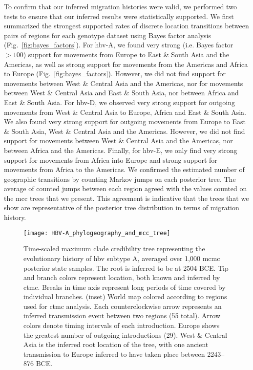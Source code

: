 To confirm that our inferred migration histories were valid, we performed two tests to ensure that our inferred results were statistically supported.
We first summarized the strongest supported rates of discrete location transitions between pairs of regions for each genotype dataset using Bayes factor analysis (Fig.~\ref{fig:bayes_factors}).
For \gls{hbv}-A, we found very strong (i.e. Bayes factor $>100$) support for movements from Europe to East \& South Asia and the Americas, as well as strong support for movements from the Americas and Africa to Europe (Fig.~\ref{fig:bayes_factors}).
However, we did not find support for movements between West \& Central Asia and the Americas, nor for movements between West \& Central Asia and East \& South Asia, nor between Africa and East \& South Asia.
For \gls{hbv}-D, we observed very strong support for outgoing movements from West \& Central Asia to Europe, Africa and East \& South Asia.
We also found very strong support for outgoing movements from Europe to East \& South Asia, West \& Central Asia and the Americas.
However, we did not find support for movements between West \& Central Asia and the Americas, nor between Africa and the Americas.
Finally, for \gls{hbv}-E, we only find very strong support for movements from Africa into Europe and strong support for movements from Africa to the Americas.
We confirmed the estimated number of geographic transitions by counting Markov jumps on each posterior tree.
The average of counted jumps between each region agreed with the values counted on the \gls{mcc} trees that we present.
This agreement is indicative that the trees that we show are representative of the posterior tree distribution in terms of migration history.

\begin{figure}[ht]
  \centering
  \medskip
  \texttt{[image: HBV-A\_phylogeography\_and\_mcc\_tree]}
  \caption[HBV-A phylogeography ]{Time-scaled maximum clade credibility tree representing the evolutionary history of \gls{hbv} subtype A, averaged over 1,000 \gls{mcmc} posterior state samples. The root is inferred to be at 2504 BCE. Tip and branch colors represent location, both known and inferred by \gls{ctmc}. Breaks in time axis represent long periods of time covered by individual branches. (inset) World map colored according to regions used for \gls{ctmc} analysis. Each counterclockwise arrow represents an inferred transmission event between two regions (55 total). Arrow colors denote timing intervals of each introduction. Europe shows the greatest number of outgoing introductions (29). West \& Central Asia is the inferred root location of the tree, with one ancient transmission to Europe inferred to have taken place between 2243--876 BCE.}
  \label{fig:HBV-A_phylogeo}
\end{figure}

